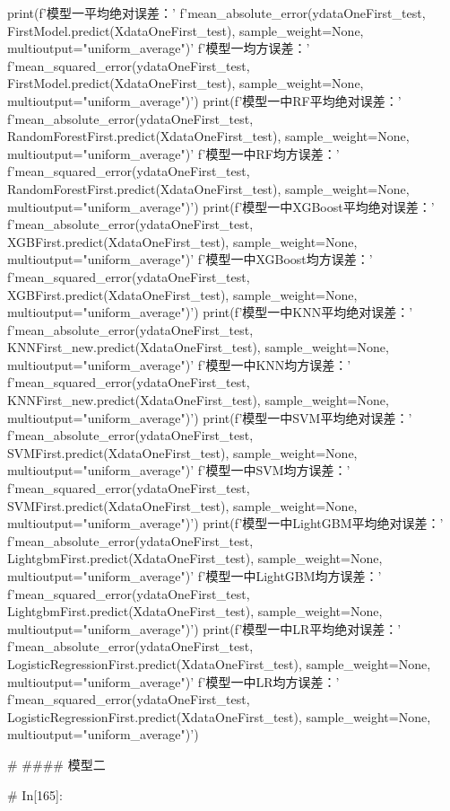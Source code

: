 \documentclass{MathorCupmodeling}
\begin{document}
\begin{python}
	
	print(f'模型一平均绝对误差：'
		  f'{mean_absolute_error(ydataOneFirst_test, FirstModel.predict(XdataOneFirst_test), sample_weight=None, multioutput="uniform_average")}\n'
		  f'模型一均方误差：'
		  f'{mean_squared_error(ydataOneFirst_test, FirstModel.predict(XdataOneFirst_test), sample_weight=None, multioutput="uniform_average")}')
	print(f'模型一中RF平均绝对误差：'
		  f'{mean_absolute_error(ydataOneFirst_test, RandomForestFirst.predict(XdataOneFirst_test), sample_weight=None, multioutput="uniform_average")}\n'
		  f'模型一中RF均方误差：'
		  f'{mean_squared_error(ydataOneFirst_test, RandomForestFirst.predict(XdataOneFirst_test), sample_weight=None, multioutput="uniform_average")}')
	print(f'模型一中XGBoost平均绝对误差：'
		  f'{mean_absolute_error(ydataOneFirst_test, XGBFirst.predict(XdataOneFirst_test), sample_weight=None, multioutput="uniform_average")}\n'
		  f'模型一中XGBoost均方误差：'
		  f'{mean_squared_error(ydataOneFirst_test, XGBFirst.predict(XdataOneFirst_test), sample_weight=None, multioutput="uniform_average")}')
	print(f'模型一中KNN平均绝对误差：'
		  f'{mean_absolute_error(ydataOneFirst_test, KNNFirst_new.predict(XdataOneFirst_test), sample_weight=None, multioutput="uniform_average")}\n'
		  f'模型一中KNN均方误差：'
		  f'{mean_squared_error(ydataOneFirst_test, KNNFirst_new.predict(XdataOneFirst_test), sample_weight=None, multioutput="uniform_average")}')
	print(f'模型一中SVM平均绝对误差：'
		  f'{mean_absolute_error(ydataOneFirst_test, SVMFirst.predict(XdataOneFirst_test), sample_weight=None, multioutput="uniform_average")}\n'
		  f'模型一中SVM均方误差：'
		  f'{mean_squared_error(ydataOneFirst_test, SVMFirst.predict(XdataOneFirst_test), sample_weight=None, multioutput="uniform_average")}')
	print(f'模型一中LightGBM平均绝对误差：'
		  f'{mean_absolute_error(ydataOneFirst_test, LightgbmFirst.predict(XdataOneFirst_test), sample_weight=None, multioutput="uniform_average")}\n'
		  f'模型一中LightGBM均方误差：'
		  f'{mean_squared_error(ydataOneFirst_test, LightgbmFirst.predict(XdataOneFirst_test), sample_weight=None, multioutput="uniform_average")}')
	print(f'模型一中LR平均绝对误差：'
		  f'{mean_absolute_error(ydataOneFirst_test, LogisticRegressionFirst.predict(XdataOneFirst_test), sample_weight=None, multioutput="uniform_average")}\n'
		  f'模型一中LR均方误差：'
		  f'{mean_squared_error(ydataOneFirst_test, LogisticRegressionFirst.predict(XdataOneFirst_test), sample_weight=None, multioutput="uniform_average")}')
	
	# #### 模型二
	
	# In[165]:
	

\end{python}
\end{document}
